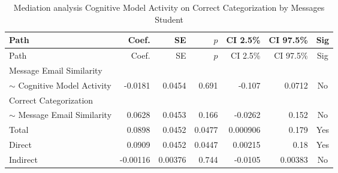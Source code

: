 \begin{longtable}{lrrrrrc}
            \caption{Mediation analysis Cognitive Model Activity on Correct Categorization by  Messages Student}\label{tab:mediation Cognitive Model Activity on Correct Categorization by  Messages Student}\\
            \toprule
            Path & Coef. & SE & $p$ & CI 2.5\% & CI 97.5\% & Sig \\
            \midrule
            \endfirsthead
            \toprule
            Path & Coef. & SE & $p$ & CI 2.5\% & CI 97.5\% & Sig \\
            \midrule
            \endhead
            \bottomrule
            \endfoot
            Message Email Similarity\\ $\sim$ Cognitive Model Activity & -0.0181 & 0.0454 & 0.691 & -0.107 & 0.0712 & No \\
Correct Categorization\\ $\sim$ Message Email Similarity & 0.0628 & 0.0453 & 0.166 & -0.0262 & 0.152 & No \\
Total & 0.0898 & 0.0452 & 0.0477 & 0.000906 & 0.179 & Yes \\
Direct & 0.0909 & 0.0452 & 0.0447 & 0.00215 & 0.18 & Yes \\
Indirect & -0.00116 & 0.00376 & 0.744 & -0.0105 & 0.00383 & No \\
\end{longtable}

